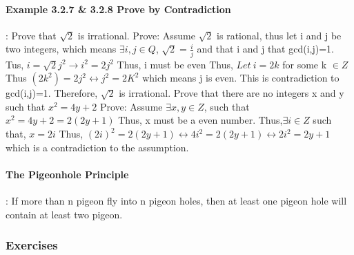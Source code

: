 \documentclass{article}
\begin{document}
\paragraph{Example 3.2.7 \& 3.2.8 Prove by Contradiction}:\newline
Prove that $\sqrt{2}$ is irrational.\newline
Prove:\newline
Assume $\sqrt{2}$ is rational, \newline
thus let i and j be two integers, which means $\exists i,j \in Q$, $\sqrt{2}=\frac{i}{j}$ and that i and j that gcd(i,j)=1.\newline
Tus, $i=\sqrt{2}j^2\to i^2=2j^2$\newline
Thus, i must be even\newline
Thus, $Let \ i=2k$ for some k $\in Z$\newline
Thus $(2k^2)=2j^2 \leftrightarrow j^2=2K^2$ which means j is even.\newline
This is contradiction to gcd(i,j)=1.\newline
Therefore, $\sqrt{2}$ is irrational.\newline
Prove that there are no integers x and y such that $x^2=4y+2$\newline
Prove:\newline
Assume $\exists x,y \in Z$, such that $x^2=4y+2=2(2y+1)$\newline
Thus, x must be a even number.\newline
Thus,$\exists i \in Z$ such that, $x=2i$\newline
Thus, $(2i)^2=2(2y+1) \leftrightarrow 4i^2=2(2y+1) \leftrightarrow 2i^2=2y+1$\newline
which is a contradiction to the assumption.
\paragraph{The Pigeonhole Principle}:\newline
If more than n pigeon fly into n pigeon
holes, then at least one pigeon hole will contain at least two pigeon.
\subsubsection{Exercises}
\end{document}
